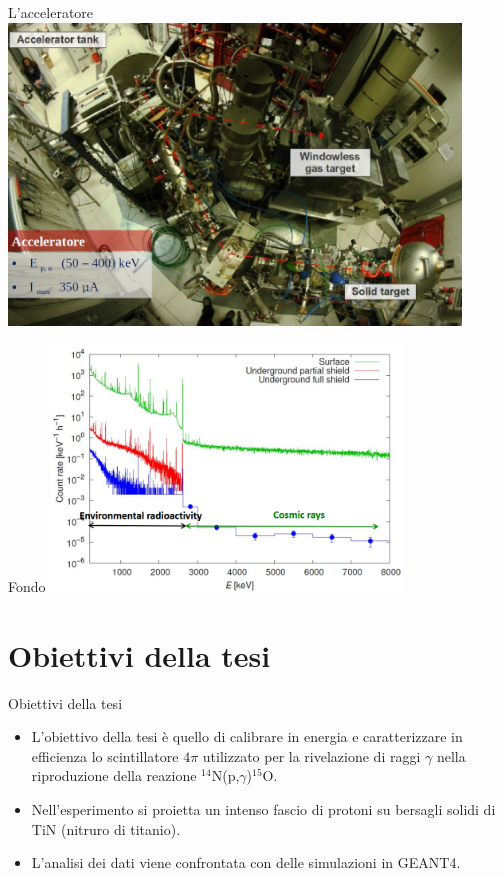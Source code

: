 \documentclass [xcolor=svgnames] {beamer}
\begin{document}
	\begin{frame}{L'acceleratore}
		\centering
		\includegraphics[width=0.9\textwidth]{img/LUNA2.png}
	\end{frame}
	
	\begin{frame}{Fondo}
		\centering
		\includegraphics[width=0.7\textwidth]{img/noise.png}
	\end{frame}
	
	\section{Obiettivi della tesi}
	\begin{frame}{Obiettivi della tesi}
		\begin{itemize}
			\item<1-> L'obiettivo della tesi è quello di calibrare in energia e caratterizzare in efficienza lo scintillatore $4\pi$ utilizzato per la rivelazione di raggi $\gamma$ nella riproduzione della reazione $^{14}$N(p,$\gamma$)$^{15}$O. 
			\item<2-> Nell'esperimento si proietta un intenso fascio di protoni su bersagli solidi di TiN (nitruro di titanio).  
			\item<3-> L'analisi dei dati viene confrontata con delle simulazioni in GEANT4.
		\end{itemize}
	\end{frame}
\end{document}
